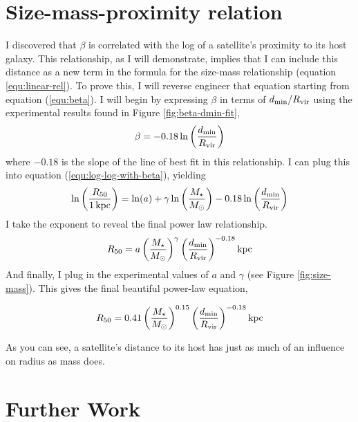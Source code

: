 
\section{Size-mass-proximity relation}

I discovered that $\beta$ is correlated with the log of a satellite's proximity to its host galaxy. This relationship, as I will demonstrate, implies that I can include this distance as a new term in the formula for the size-mass relationship (equation \ref{equ:linear-rel}). To prove this, I will reverse engineer that equation starting from equation (\ref{equ:beta}). I will begin by expressing $\beta$ in terms of $d_{\rm{min}} / R_{\rm{vir}}$ using the experimental results found in Figure \ref{fig:beta-dmin-fit},
\begin{equation}
    \beta = -0.18 \ln\left( \frac{d_{\rm{min}}}{R_{\rm{vir}}} \right)
\end{equation}
where $-0.18$ is the slope of the line of best fit in this relationship. I can plug this into equation (\ref{equ:log-log-with-beta}), yielding
\begin{equation}
    \ln \left(
        \frac{R_{50}}{1 \rm{\,kpc}}
    \right)
    =
    \ln(a)
    + \gamma \ln \left(
        \frac{M_\star}{M_\odot}
    \right)
    -0.18 \ln\left( \frac{d_{\rm{min}}}{R_{\rm{vir}}} \right)
\end{equation}
I take the exponent to reveal the final power law relationship.
\begin{equation}
    R_{50} = a
    \left( \frac{M_\star}{M_\odot} \right)^\gamma
    \left( \frac{d_{\rm{min}}}{R_{\rm{vir}}} \right)^{-0.18}
    \text{kpc}
\end{equation}
And finally, I plug in the experimental values of $a$ and $\gamma$ (see Figure \ref{fig:size-mass}). This gives the final beautiful power-law equation,

\begin{equation}
    R_{50} = 0.41
    \left( \frac{M_\star}{M_\odot} \right)^{0.15}
    \left( \frac{d_{\rm{min}}}{R_{\rm{vir}}} \right)^{-0.18}
    \text{kpc}
\end{equation}

As you can see, a satellite's distance to its host has just as much of an influence on radius as mass does. 




\section{Further Work}

